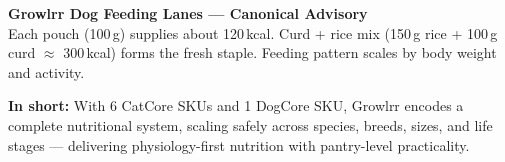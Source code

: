 \begin{flushleft}
\textbf{Growlrr Dog Feeding Lanes — Canonical Advisory}\\[4pt]
Each pouch (100\,g) supplies about 120\,kcal. 
Curd + rice mix (150\,g rice + 100\,g curd $\approx$ 300\,kcal) forms the fresh staple. 
Feeding pattern scales by body weight and activity.
\end{flushleft}


\noindent\textbf{In short:} With 6 CatCore SKUs and 1 DogCore SKU, Growlrr encodes a complete nutritional system, scaling safely across species, breeds, sizes, and life stages --- delivering physiology-first nutrition with pantry-level practicality.



